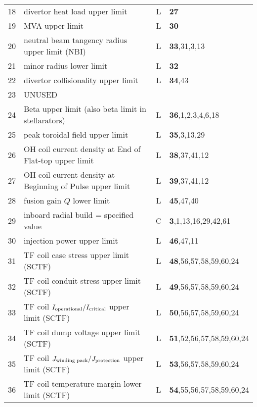 \documentclass[11pt,a4paper]{report}
\begin{document}
\begin{table}[tbph]
\begin{center}
\begin{tabular}{||c|l|c|l||}
18  & divertor heat load upper limit                            & L    & \textbf{27} \\
19  & MVA upper limit                                           & L    & \textbf{30} \\
20  & neutral beam tangency radius upper limit (NBI)            & L    & \textbf{33},31,3,13 \\
21  & minor radius lower limit                                  & L    & \textbf{32} \\
22  & divertor collisionality upper limit                       & L    & \textbf{34},43 \\
23  & UNUSED                                                    &      & \\
24  & Beta upper limit (also beta limit in stellarators)        & L    & \textbf{36},1,2,3,4,6,18 \\
25  & peak toroidal field upper limit                           & L    & \textbf{35},3,13,29 \\
26  & OH coil current density at End of Flat-top upper limit    & L    & \textbf{38},37,41,12 \\
27  & OH coil current density at Beginning of Pulse upper limit & L    & \textbf{39},37,41,12 \\
28  & fusion gain $Q$ lower limit                               & L    & \textbf{45},47,40 \\
29  & inboard radial build = specified value                    & C    & \textbf{3},1,13,16,29,42,61 \\
30  & injection power upper limit                               & L    & \textbf{46},47,11 \\
31  & TF coil case stress upper limit (SCTF)                    & L    & \textbf{48},56,57,58,59,60,24 \\
32  & TF coil conduit stress upper limit (SCTF)                 & L    & \textbf{49},56,57,58,59,60,24 \\
33  & TF coil $I_{\mbox{\scriptsize operational}}/
I_{\mbox{\scriptsize critical}}$ upper limit (SCTF)                    & L    & \textbf{50},56,57,58,59,60,24 \\
34  & TF coil dump voltage upper limit (SCTF)                   & L    & \textbf{51},52,56,57,58,59,60,24 \\
35  & TF coil $J_{\mbox{\scriptsize winding pack}}/
J_{\mbox{\scriptsize protection}}$ upper limit (SCTF)                   & L    & \textbf{53},56,57,58,59,60,24 \\
36  & TF coil temperature margin lower limit (SCTF)             & L    & \textbf{54},55,56,57,58,59,60,24 \\

\end{tabular}
\end{center}
\end{table}
\end{document}
